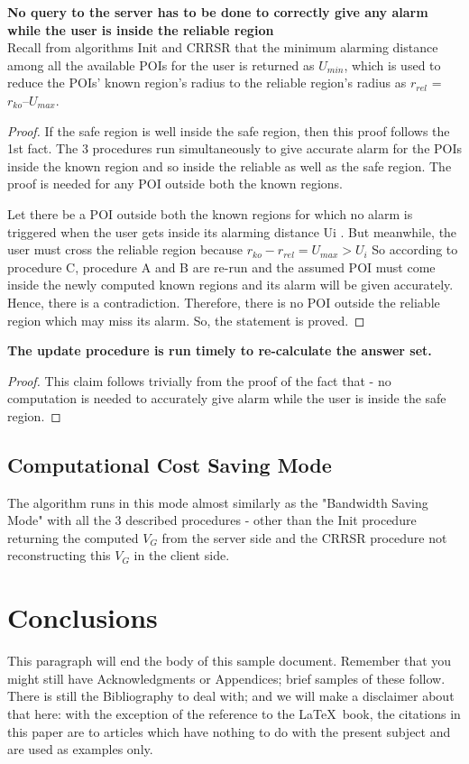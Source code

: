 \documentclass{sig-alternate}
\begin{document}
\textbf{No query to the server has to be done to correctly give any alarm while the user is inside the reliable region}\\
Recall from algorithms Init and CRRSR that the minimum alarming distance among all the available POIs for the user is returned as $U_{min}$, which is used to reduce the POIs' known region's radius to the reliable region's radius as $r_{rel}$ = $r_{ko} – U_{max}$.

\begin{proof}
If the safe region is well inside the safe region, then this proof follows the 1st fact.
The 3 procedures run simultaneously to give accurate alarm for the POIs inside the known region and so inside the reliable as well as the safe region.
The proof is needed for any POI outside both the known regions.

Let there be a POI outside both the known regions for which no alarm is triggered when the user gets inside its alarming distance Ui . 
But meanwhile, the user must cross the reliable region because $r_{ko} - r_{rel} = U_{max} > U_i$ 
So according to procedure C, procedure A and B are re-run and the assumed POI must come inside the newly computed known regions and its alarm will be given accurately.
Hence, there is a contradiction.
Therefore, there is no POI outside the reliable region which may miss its alarm.
So, the statement is proved.
\end{proof}

\textbf{The update procedure is run timely to re-calculate the answer set.}
\begin{proof} 
This claim follows trivially from the proof of the fact that - no computation is needed to accurately give alarm while the user is inside the safe region.
\end{proof}

\subsection{Computational Cost Saving Mode}
The algorithm runs in this mode almost similarly as the "Bandwidth Saving Mode" with all the 3 described procedures - other than the Init procedure returning the computed $V_G$ from the server side and the CRRSR procedure not reconstructing this $V_G$ in the client side.


\section{Conclusions}
This paragraph will end the body of this sample document.
Remember that you might still have Acknowledgments or
Appendices; brief samples of these
follow.  There is still the Bibliography to deal with; and
we will make a disclaimer about that here: with the exception
of the reference to the \LaTeX\ book, the citations in
this paper are to articles which have nothing to
do with the present subject and are used as
examples only.
\end{document}
